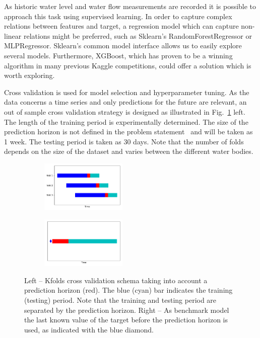 \documentclass{article}
\begin{document}
As historic water level and water flow measurements are recorded it is possible to approach this task using supervised learning. In order to capture complex relations between features and target, a regression model which can capture non-linear relations might be preferred, such as Sklearn's RandomForestRegressor or MLPRegressor. Sklearn's common model interface allows us to easily explore several models. Furthermore, XGBoost, which has proven to be a winning algorithm in many previous Kaggle competitions, could offer a solution which is worth exploring. 

Cross validation is used for model selection and hyperparameter tuning. As the data concerns a time series and only predictions for the future are relevant, an out of sample cross validation strategy is designed as illustrated in Fig.~\ref{fig:kfolds_cv} left. The length of the training period is experimentally determined. The size of the prediction horizon is not defined in the problem statement~\cite{kaggle} and will be taken as 1 week. The testing period is taken as 30 days. Note that the number of folds depends on the size of the dataset and varies between the different water bodies.

\begin{figure}[htb]
     \centering
     \begin{subfigure}
         \centering
         \includegraphics[width=0.45\textwidth]{figs/kfolds.pdf}
     \end{subfigure}
% 
     \begin{subfigure}
         \centering
         \includegraphics[width=0.45\textwidth]{figs/benchmark.pdf}
     \end{subfigure}
\caption{Left -- Kfolds cross validation schema taking into account a prediction horizon (red). The blue (cyan) bar indicates the training (testing) period. Note that the training and testing period are separated by the prediction horizon. Right -- As benchmark model the last known value of the target before the prediction horizon is used, as indicated with the blue diamond.}
\label{fig:kfolds_cv}
\end{figure}
\end{document}
